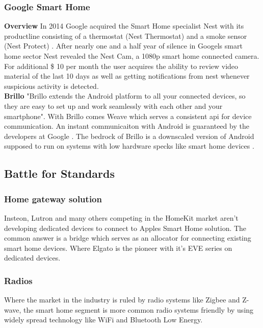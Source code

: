 				\pagebreak

		\subsubsection{Google Smart Home}
			\textbf{Overview}
				In 2014 Google acquired the Smart Home specialist Nest with its productline consisting of a thermostat (Nest Thermostat) and a smoke sensor (Nest Protect) \parencite{GoogleAcquiresNest}. After nearly one and a half year of silence in Googels smart home sector Nest revealed the Nest Cam, a 1080p smart home connected camera. For additional \$ 10 per month the user acquires the ability to review video material of the last 10 days as well as getting notifications from nest whenever suspicious activity is detected.\\

			\textbf{Brillo}
				"Brillo extends the Android platform to all your connected devices, so they are easy to set up and work seamlessly with each other and your smartphone"\parencite{Brillo}. With Brillo comes Weave which serves a consistent api for device communication. An instant communicaiton with Android is guaranteed by the developers at Google \parencite{BrilloHeise}. The bedrock of Brillo is a downscaled version of Android supposed to run on systems with low hardware specks like smart home devices \parencite{BrilloHeise}.

				\pagebreak




	\subsection{Battle for Standards}

		\subsubsection{Home gateway solution}
			Insteon, Lutron and many others competing in the HomeKit market aren't developing dedicated devices to connect to Apples Smart Home solution. The common answer is a bridge which serves as an allocator for connecting existing smart home devices. Where Elgato is the pioneer with it's EVE series on dedicated devices.\\

		\subsubsection{Radios}
			Where the market in the industry is ruled by radio systems like Zigbee and Z-wave, the smart home segment is more common radio systems friendly by using widely spread technology like WiFi and Bluetooth Low Energy.\\

